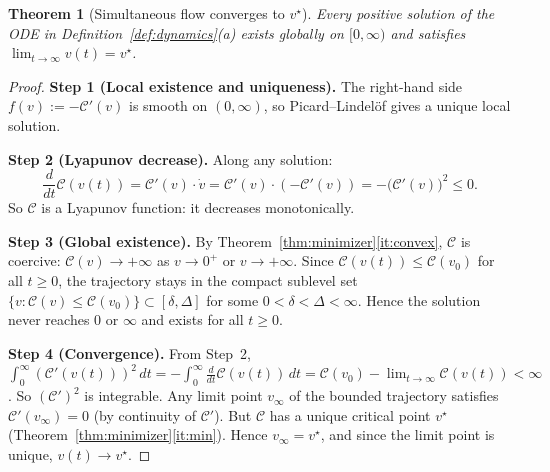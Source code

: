 \documentclass[11pt]{amsart}
\newtheorem{theorem}{Theorem}[section]
\theoremstyle{definition}
\theoremstyle{remark}
\begin{document}
\begin{theorem}[Simultaneous flow converges to $v^\star$]
\label{thm:flow}
Every positive solution of the ODE in
Definition~\ref{def:dynamics}(a) exists globally on $[0,\infty)$ and
satisfies $\lim_{t\to\infty}v(t)=v^\star$.
\end{theorem}
\begin{proof}
\textbf{Step 1 (Local existence and uniqueness).}
The right-hand side $f(v):=-\mathcal C'(v)$ is smooth on $(0,\infty)$,
so Picard--Lindel\"of gives a unique local solution.

\textbf{Step 2 (Lyapunov decrease).}
Along any solution:
\[
\frac{d}{dt}\mathcal C(v(t))
=\mathcal C'(v)\cdot\dot v
=\mathcal C'(v)\cdot(-\mathcal C'(v))
=-\bigl(\mathcal C'(v)\bigr)^2\le0.
\]
So $\mathcal C$ is a Lyapunov function: it decreases monotonically.

\textbf{Step 3 (Global existence).}
By Theorem~\ref{thm:minimizer}\ref{it:convex}, $\mathcal C$ is coercive:
$\mathcal C(v)\to+\infty$ as $v\to0^+$ or $v\to+\infty$.
Since $\mathcal C(v(t))\le\mathcal C(v_0)$ for all $t\ge0$, the trajectory
stays in the compact sublevel set
$\{v:\mathcal C(v)\le\mathcal C(v_0)\}\subset[\delta,\Delta]$ for some
$0<\delta<\Delta<\infty$.  Hence the solution never reaches $0$ or $\infty$
and exists for all $t\ge0$.

\textbf{Step 4 (Convergence).}
From Step~2, $\int_0^\infty(\mathcal C'(v(t)))^2\,dt
=-\int_0^\infty\frac{d}{dt}\mathcal C(v(t))\,dt
=\mathcal C(v_0)-\lim_{t\to\infty}\mathcal C(v(t))<\infty$.
So $(\mathcal C')^2$ is integrable.  Any limit point $v_\infty$ of the
bounded trajectory satisfies $\mathcal C'(v_\infty)=0$ (by continuity of
$\mathcal C'$).  But $\mathcal C$ has a unique critical point $v^\star$
(Theorem~\ref{thm:minimizer}\ref{it:min}).  Hence $v_\infty=v^\star$,
and since the limit point is unique, $v(t)\to v^\star$.
\end{proof}
\end{document}
